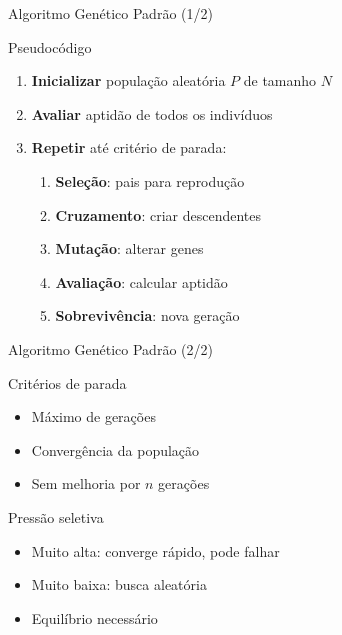 \begin{frame}{Algoritmo Genético Padrão (1/2)}
\begin{block}{Pseudocódigo}
\begin{enumerate}
    \item \textbf{Inicializar} população aleatória $P$ de tamanho $N$
    \item \textbf{Avaliar} aptidão de todos os indivíduos
    \item \textbf{Repetir} até critério de parada:
    \begin{enumerate}
        \item \textbf{Seleção}: pais para reprodução
        \item \textbf{Cruzamento}: criar descendentes
        \item \textbf{Mutação}: alterar genes
        \item \textbf{Avaliação}: calcular aptidão
        \item \textbf{Sobrevivência}: nova geração
    \end{enumerate}
\end{enumerate}
\end{block}
\end{frame}

\begin{frame}{Algoritmo Genético Padrão (2/2)}
\begin{block}{Critérios de parada}
\begin{itemize}
    \item Máximo de gerações
    \item Convergência da população
    \item Sem melhoria por $n$ gerações
\end{itemize}
\end{block}

\vspace{0.3cm}
\begin{block}{Pressão seletiva}
\begin{itemize}
    \item Muito alta: converge rápido, pode falhar
    \item Muito baixa: busca aleatória
    \item Equilíbrio necessário
\end{itemize}
\end{block}
\end{frame}

